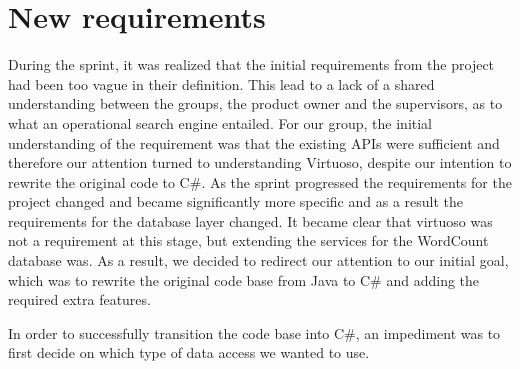 \section{New requirements} \label{ssec:newRequirements}
During the sprint, it was realized that the initial requirements from the \knox{} project had been too vague in their definition. This lead to a lack of a shared understanding between the groups, the product owner and the supervisors, as to what an operational search engine entailed. For our group, the initial understanding of the requirement was that the existing APIs were sufficient and therefore our attention turned to understanding Virtuoso, despite our intention to rewrite the original code to C\#. 
As the sprint progressed the requirements for the \knox{} project changed and became significantly more specific and as a result the requirements for the database layer changed. It became clear that virtuoso was not a requirement at this stage, but extending the services for the WordCount database was. As a result, we decided to redirect our attention to our initial goal, which was to rewrite the original code base from Java to C\# and adding the required extra features.

In order to successfully transition the code base into C\#, an impediment was to first decide on which type of data access we wanted to use.


